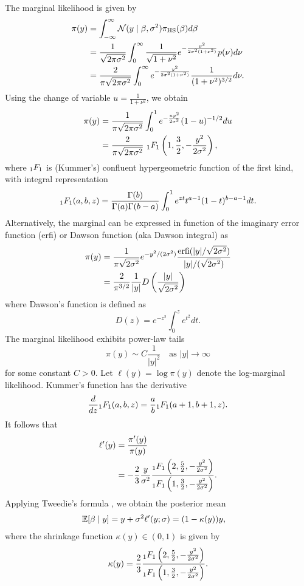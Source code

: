 The marginal likelihood is given by
\begin{align*}
    \pi(y)&=\int_{-\infty}^{\infty} \mathcal N(y\mid \beta,\sigma^2)\pi_{\mathrm{HS}}(\beta)d \beta\\
    &=\frac{1}{\sqrt{2\pi\sigma^2}} \int_0^\infty \frac{1}{\sqrt{1+\nu^2}}e^{-\frac{y^2}{2\sigma^2(1+\nu^2)}}p(\nu)d\nu\\
    &=\frac{2}{\pi\sqrt{2\pi\sigma^2}} \int_0^\infty e^{-\frac{y^2}{2\sigma^2(1+\nu^2)}}\frac{1}{(1+\nu^2)^{3/2}}d\nu.
\end{align*}
Using the change of variable $u=\frac{1}{1+\nu^2}$, we obtain
\begin{align*}
    \pi(y)&=\frac{1}{\pi\sqrt{2\pi\sigma^2}} \int_0^1 e^{-\frac{uy^2}{2\sigma^2}}(1-u)^{-1/2}du\\
    & = \frac{2}{\pi\sqrt{2\pi\sigma^2}} ~{}_1F_1\left(1,\frac{3}{2},-\frac{y^2}{2\sigma^2}\right),
\end{align*}
where ${}_1F_1$ is (Kummer's) confluent hypergeometric function of the first kind, with integral representation
\begin{align*}
    {}_1F_1(a,b,z)=\frac{\Gamma(b)}{\Gamma(a)\Gamma(b-a)}\int_0^1 e^{zt}t^{a-1}(1-t)^{b-a-1}dt.
\end{align*}
Alternatively, the marginal can be expressed in function of the imaginary error function (erfi) or Dawson function (aka Dawson integral) as
\begin{align*}
    \pi(y)&=\frac{1}{\pi\sqrt{2\sigma^2}} e^{-y^2/(2\sigma^2)}\frac{\mathrm{erfi}(|y|/\sqrt{2\sigma^2})}{|y|/(\sqrt{2\sigma^2})}\\
    &=\frac{2}{\pi^{3/2}}\frac{1}{|y|}D\left( \frac{|y|}{\sqrt{2\sigma^2}}\right)
\end{align*}
where Dawson's function is defined as
$$
    D(z)=e^{-z^2}\int_0^z e^{t^2}dt.
$$ 
The marginal likelihood exhibits power-law tails
$$
    \pi(y)\sim C\frac{1}{|y|^2}\quad \text{as } |y|\to\infty
$$
for some constant $C>0$. Let $\ell(y)=\log\pi(y)$ denote the log-marginal likelihood. Kummer's function has the derivative
\begin{align*}
    \frac{d}{dz}{}_1F_1(a,b,z)=\frac{a}{b}{}_1F_1(a+1,b+1,z).
\end{align*}
It follows that
\begin{align*}
    \ell'(y) &= \frac{\pi'(y)}{\pi(y)}\\
    &=-\frac{2}{3}\frac{y}{\sigma^2}\frac{{}_1F_1\left(2,\frac{5}{2},-\frac{y^2}{2\sigma^2}\right)}{{}_1F_1\left(1,\frac{3}{2},-\frac{y^2}{2\sigma^2}\right)}.
\end{align*}
Applying Tweedie's formula \citep{}, we obtain the posterior mean
\begin{align}
    \mathbb E[\beta \mid y] &= y + \sigma^2 \ell'(y;\sigma)= (1-\kappa(y)) y,
\end{align}
where the shrinkage function $\kappa(y)\in(0,1)$ is given by
$$
    \kappa(y)=\frac{2}{3}\frac{{}_1F_1\left(2,\frac{5}{2},-\frac{y^2}{2\sigma^2}\right)}{{}_1F_1\left(1,\frac{3}{2},-\frac{y^2}{2\sigma^2}\right)}.
$$


